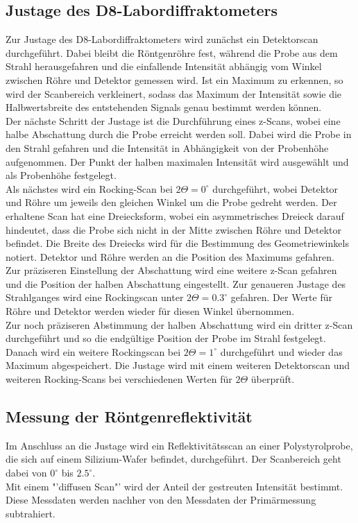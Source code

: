 \documentclass[captions=tableheading]{scrartcl}
\begin{document}
\subsection{Justage des D8-Labordiffraktometers}
Zur Justage des D8-Labordiffraktometers wird zunächst ein Detektorscan durchgeführt. Dabei bleibt die Röntgenröhre fest, während die Probe aus dem Strahl herausgefahren und die einfallende Intensität abhängig vom Winkel zwischen Röhre und Detektor gemessen wird. Ist ein Maximum zu erkennen, so wird der Scanbereich verkleinert, sodass das Maximum der Intensität sowie die Halbwertsbreite des entstehenden Signals genau bestimmt werden können. \\
Der nächste Schritt der Justage ist die Durchführung eines z-Scans, wobei eine halbe Abschattung durch die Probe erreicht werden soll. Dabei wird die Probe in den Strahl gefahren und die Intensität in Abhängigkeit von der Probenhöhe aufgenommen. Der Punkt der halben maximalen Intensität wird ausgewählt und als Probenhöhe festgelegt. \\
Als nächstes wird ein Rocking-Scan bei $2\Theta=0^{\circ}$ durchgeführt, wobei Detektor und Röhre um jeweils den gleichen Winkel um die Probe gedreht werden. Der erhaltene Scan hat eine Dreiecksform, wobei ein asymmetrisches Dreieck darauf hindeutet, dass die Probe sich nicht in der Mitte zwischen Röhre und Detektor befindet. Die Breite des Dreiecks wird für die Bestimmung des Geometriewinkels notiert. Detektor und Röhre werden an die Position des Maximums gefahren. \\
Zur präziseren Einstellung der Abschattung wird eine weitere z-Scan gefahren und die Position der halben Abschattung eingestellt. Zur genaueren Justage des Strahlganges wird eine Rockingscan unter $2\Theta=0.3^{\circ}$ gefahren. Der Werte für Röhre und Detektor werden wieder für diesen Winkel übernommen. \\
Zur noch präziseren Abstimmung der halben Abschattung wird ein dritter z-Scan durchgeführt und so die endgültige Position der Probe im Strahl festgelegt. Danach wird ein weitere Rockingscan bei $2\Theta=1^{\circ}$ durchgeführt und wieder das Maximum abgespeichert. Die Justage wird mit einem weiteren Detektorscan und weiteren Rocking-Scans bei verschiedenen Werten für $2\Theta$ überprüft.

\subsection{Messung der Röntgenreflektivität}
Im Anschluss an die Justage wird ein Reflektivitätsscan an einer Polystyrolprobe, die sich auf einem Silizium-Wafer befindet, durchgeführt. Der Scanbereich geht dabei von $0^{\circ}$ bis $2.5^{\circ}$. \\
Mit einem "'diffusen Scan"' wird der Anteil der gestreuten Intensität bestimmt. Diese Messdaten werden nachher von den Messdaten der Primärmessung subtrahiert.
\end{document}

